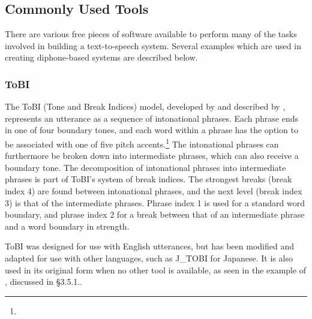 \documentclass[12pt]{article}
\begin{document}
	\subsection{Commonly Used Tools}

	There are various free pieces of software available to perform many of the tasks involved in building a text-to-speech system. Several examples which are used in creating diphone-based systems are described below. \par

		\subsubsection{ToBI}
		The ToBI (Tone and Break Indices) model, developed by \citet{tobi} and described by \citet{slp}, represents an utterance as a sequence of intonational phrases. Each phrase ends in one of four boundary tones, and each word within a phrase has the option to be associated with one of five pitch accents.\footnote{} The intonational phrases can furthermore be broken down into intermediate phrases, which can also receive a boundary tone. The decomposition of intonational phrases into intermediate phrases is part of ToBI's system of break indices. The strongest breaks (break index 4) are found between intonational phrases, and the next level (break index 3) is that of the intermediate phrases. Phrase index 1 is used for a standard word boundary, and phrase index 2 for a break between that of an intermediate phrase and a word boundary in strength. \par

		ToBI was designed for use with English utterances, but has been modified and adapted for use with other languages, such as J\_TOBI for Japanese. It is also used in its original form when no other tool is available, as seen in the example of \citet{mongolian}, discussed in \S 3.5.1.. \par
\end{document}
